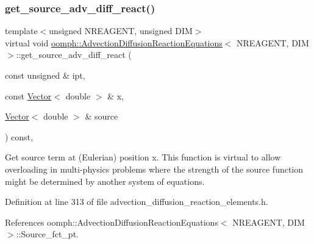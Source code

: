 \mbox{\label{classoomph_1_1AdvectionDiffusionReactionEquations_a2a279f4485b7a46a8684cda2678ae825}} 
\subsubsection{\texorpdfstring{get\+\_\+source\+\_\+adv\+\_\+diff\+\_\+react()}{get\_source\_adv\_diff\_react()}}
{\footnotesize\ttfamily template$<$unsigned N\+R\+E\+A\+G\+E\+NT, unsigned D\+IM$>$ \\
virtual void \hyperlink{classoomph_1_1AdvectionDiffusionReactionEquations}{oomph\+::\+Advection\+Diffusion\+Reaction\+Equations}$<$ N\+R\+E\+A\+G\+E\+NT, D\+IM $>$\+::get\+\_\+source\+\_\+adv\+\_\+diff\+\_\+react (\begin{DoxyParamCaption}\item[{const unsigned \&}]{ipt,  }\item[{const \hyperlink{classoomph_1_1Vector}{Vector}$<$ double $>$ \&}]{x,  }\item[{\hyperlink{classoomph_1_1Vector}{Vector}$<$ double $>$ \&}]{source }\end{DoxyParamCaption}) const\hspace{0.3cm}{\ttfamily [inline]}, {\ttfamily [virtual]}}



Get source term at (Eulerian) position x. This function is virtual to allow overloading in multi-\/physics problems where the strength of the source function might be determined by another system of equations. 



Definition at line 313 of file advection\+\_\+diffusion\+\_\+reaction\+\_\+elements.\+h.



References oomph\+::\+Advection\+Diffusion\+Reaction\+Equations$<$ N\+R\+E\+A\+G\+E\+N\+T, D\+I\+M $>$\+::\+Source\+\_\+fct\+\_\+pt.

\mbox{\label{classoomph_1_1AdvectionDiffusionReactionEquations_a2f4bc51e9f535f951f6b1d5827ee3264}} 
